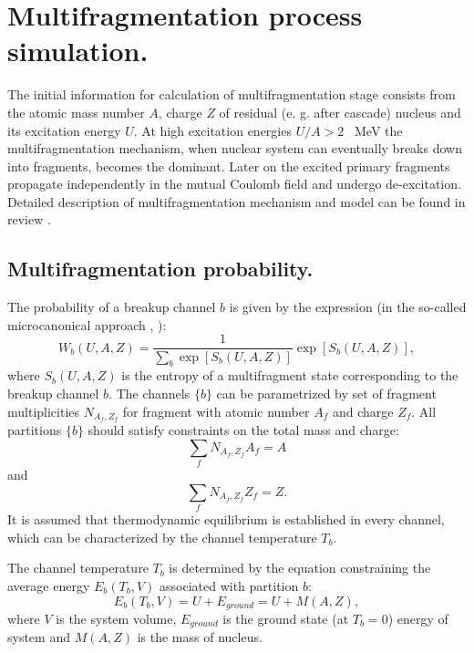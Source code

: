 \section{Multifragmentation process simulation.}

\hspace{1.0em}The initial information for calculation of
multifragmentation stage consists from the atomic mass number $A$,
charge $Z$ of residual (e. g. after cascade) nucleus and its excitation
energy $U$.  At high excitation energies $U/A > 2$ \ MeV the
multifragmentation mechanism, when nuclear system can eventually breaks
down into fragments, becomes the dominant. Later on the excited primary
fragments propagate independently in the mutual Coulomb field and
undergo de-excitation.  Detailed description of multifragmentation
mechanism and model can be found in review \cite{BBIMS95}.

\subsection{Multifragmentation probability.}

\hspace{1.0em}The probability of a breakup channel $b$ is given by the
expression (in the so-called microcanonical approach \cite{BBIMS95},
\cite{Botvina87}):
\begin{equation}
\label{MFS1}W_b(U,A,Z)=\frac{1}{\sum_{b}\exp [S_b(U,A,Z)]} \exp [S_b(U,A,Z)], 
\end{equation}
where $S_b(U,A,Z)$ is the entropy of a multifragment state corresponding
to the breakup channel $b$. The channels $\{b\}$ can be parametrized by
set of fragment multiplicities $N_{A_f,Z_f}$ for fragment with atomic
number $A_f$ and charge $Z_f$. All partitions $\{b\}$ should satisfy
constraints on the total mass and charge:
\begin{equation}
\label{MFS2}\sum_{f}N_{A_f,Z_f}A_f = A 
\end{equation}
and
\begin{equation}
\label{MFS3}\sum_{f}N_{A_f,Z_f}Z_f = Z. 
\end{equation}
It is assumed \cite{Botvina87} that thermodynamic equilibrium is
established in every channel, which can be characterized by the channel
temperature $T_b$.

The channel temperature $T_b$ is determined by the equation constraining
the average energy $E_b(T_b, V)$ associated with partition $b$:
\begin{equation}
\label{MFS4}E_b(T_b, V)= U+E_{ground} = U+M(A,Z), 
\end{equation}
where $V$ is the system volume, $E_{ground}$ is the ground state (at
$T_b = 0$) energy of system and $M(A,Z)$ is the mass of nucleus.


